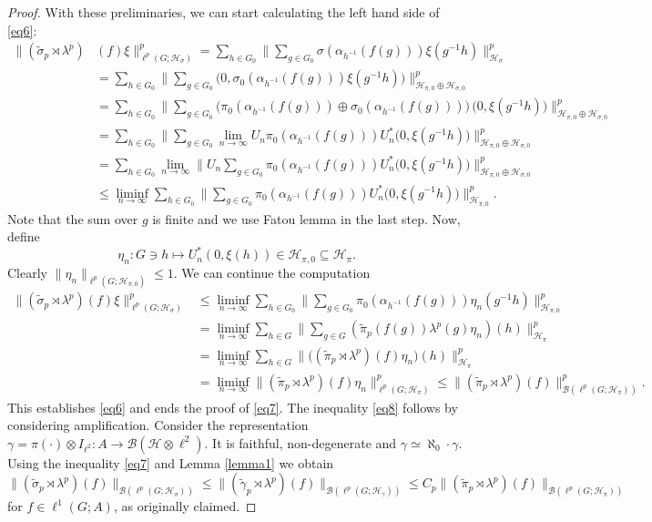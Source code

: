 \documentclass[12pt]{amsart}
\theoremstyle{definition}
\theoremstyle{remark}
\numberwithin{equation}{section}
\newcommand{\mc}{\mathcal}
\newcommand{\wt}{\widetilde}
\begin{document}
\begin{proof}
With these preliminaries, we can start calculating the left hand side of \eqref{eq6}:
\begin{align*}
\|(\wt{\sigma}_p\rtimes \lambda^p)&(f)\xi\|^p_{\ell^p(G;\mc{H}_\sigma)}=
\sum_{h\in G_0}\bigl\|
\sum_{g\in G_0}\sigma (\alpha_{h^{-1}}(f(g)))\xi(g^{-1}h)\bigr\|_{\mc{H}_\sigma}^p\\
&=
\sum_{h\in G_0}\bigl\|
\sum_{g\in G_0}\bigl(0,\sigma_0 (\alpha_{h^{-1}}(f(g)))\xi(g^{-1}h) \bigr)\bigr\|_{\mc{H}_{\pi,0}\oplus \mc{H}_{\sigma,0}}^p\\
&=
\sum_{h\in G_0}\bigl\|
\sum_{g\in G_0}
\bigl(\pi_0(\alpha_{h^{-1}}(f(g)))\oplus \sigma_0(\alpha_{h^{-1}}(f(g))) \bigr)\,
\bigl(0,\xi(g^{-1}h) \bigr)\bigr\|_{\mc{H}_{\pi,0}\oplus \mc{H}_{\sigma,0}}^p\\
&=
\sum_{h\in G_0}\bigl\|
\sum_{g\in G_0}
\lim_{n\to\infty} U_n
\pi_0(\alpha_{h^{-1}}(f(g))) U_n^*
\bigl(0,\xi(g^{-1}h) \bigr)\bigr\|_{\mc{H}_{\pi,0}\oplus \mc{H}_{\sigma,0}}^p\\
&=
\sum_{h\in G_0}\lim_{n\to\infty} \bigl\|
U_n \sum_{g\in G_0}
\pi_0(\alpha_{h^{-1}}(f(g))) U_n^*
\bigl(0,\xi(g^{-1}h) \bigr)\bigr\|_{\mc{H}_{\pi,0}\oplus \mc{H}_{\sigma,0}}^p\\
&\le
\liminf_{n\to\infty}
\sum_{h\in G_0} \bigl\|
 \sum_{g\in G_0}
\pi_0(\alpha_{h^{-1}}(f(g))) U_n^*
\bigl(0,\xi(g^{-1}h) \bigr)\bigr\|_{\mc{H}_{\pi,0}}^p.
\end{align*}
Note that the sum over $g$ is finite and we use Fatou lemma in the last step. Now, define
\[
\eta_n\colon G\ni h\mapsto U_n^*(0,\xi(h))\in \mc{H}_{\pi,0}\subseteq \mc{H}_\pi.
\]
Clearly $\|\eta_n\|_{\ell^p(G;\mc{H}_{\pi,0})}\le 1$. We can continue the computation
\begin{align*}
\|(\wt{\sigma}_p\rtimes\lambda^p)(f)\xi\|^p_{\ell^p(G;\mc{H}_\sigma)}&\le
\liminf_{n\to\infty} \sum_{h\in G_0}\bigl\|
\sum_{g\in G_0}\pi_0(\alpha_{h^{-1}}(f(g))) \eta_n(g^{-1} h)\bigr\|^p_{\mc{H}_{\pi,0}}\\
&=
\liminf_{n\to\infty} \sum_{h\in G}\bigl\|
\sum_{g\in G}(\wt{\pi}_p(f(g)) \lambda^p(g)\eta_n)( h)\bigr\|^p_{\mc{H}_\pi}\\
&=
\liminf_{n\to\infty} \sum_{h\in G}\bigl\|
\bigl(
(\wt{\pi}_p\rtimes\lambda^p)(f) \eta_n \bigr)(h)\bigr\|^p_{\mc{H}_\pi}\\
&=
\liminf_{n\to\infty}
\|(\wt{\pi}_p\rtimes\lambda^p)(f)\eta_n\|_{\ell^p(G;\mc{H}_\pi)}^p\le
\|(\wt{\pi}_p\rtimes\lambda^p)(f)\|^p_{\mc{B}(\ell^p(G;\mc{H}_\pi))}.
\end{align*}
This establishes \eqref{eq6} and ends the proof of \eqref{eq7}.
\smallskip
The inequality \eqref{eq8} follows by considering amplification. Consider the representation $\gamma=\pi(\cdot)\otimes I_{\ell^2}\colon A\rightarrow \mc{B}(\mc{H}\otimes \ell^2)$. It is faithful, non-degenerate and $\gamma\simeq \aleph_0\cdot \gamma$. Using the inequality \eqref{eq7} and Lemma \ref{lemma1} we obtain
\[
\| (\wt{\sigma}_p\rtimes \lambda^p)(f) \|_{\mc{B}(\ell^p(G;\mc{H}_\sigma))}\le
\|(\wt{\gamma}_p\rtimes\lambda^p)(f)\|_{\mc{B}(\ell^p(G;\mc{H}_\gamma))}\le
C_p \|(\wt{\pi}_p\rtimes\lambda^p)(f)\|_{\mc{B}(\ell^p(G;\mc{H}_\pi))}
\]
for $f\in \ell^1(G;A)$, as originally claimed.
\end{proof}
\end{document}
